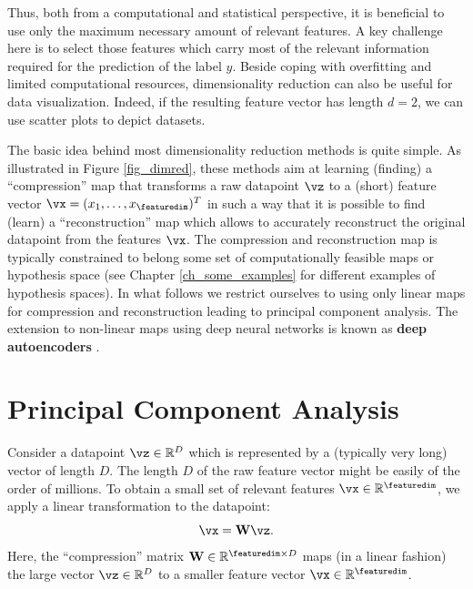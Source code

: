 \documentclass[12pt]{report}
\begin{document}
Thus, both from a computational and statistical perspective, it is beneficial to use 
only the maximum necessary amount of relevant features. A key challenge here is 
to select those features which carry most of the relevant information required for 
the prediction of the label $y$. Beside coping with overfitting and limited computational 
resources, dimensionality reduction can also be useful for data visualization. Indeed, if 
the resulting feature vector has length $d=2$, we can use scatter plots to depict datasets. 

The basic idea behind most dimensionality reduction methods is quite simple. As 
illustrated in Figure \ref{fig_dimred}, these methods aim at learning (finding) a ``compression'' 
map that transforms a raw datapoint $\vz$ to a (short) feature vector $\vx=(x_{1},\ldots,x_{\featuredim})^{T}$ 
in such a way that it is possible to find (learn) a ``reconstruction'' map which allows to accurately 
reconstruct the original datapoint from the features $\vx$. The compression and reconstruction 
map is typically constrained to belong some set of computationally feasible maps or hypothesis 
space (see Chapter \ref{ch_some_examples} for different examples of hypothesis spaces). In what 
follows we restrict ourselves to using only linear maps for compression and reconstruction leading 
to principal component analysis. The extension to non-linear maps using deep neural networks 
is known as {\bf deep autoencoders} \cite[Ch. 14]{Goodfellow-et-al-2016}. 


\section{Principal Component Analysis} 
\label{sec_pca}

Consider a datapoint $\vz \in \mathbb{R}^{D}$ which is represented by a (typically very long) 
vector of length $D$. The length $D$ of the raw feature vector might be easily of the order of 
millions. To obtain a small set of relevant features $\vx \in \mathbb{R}^{\featuredim}$, we apply 
a linear transformation to the datapoint: 
\begin{equation} 
\label{equ_feat_learning_matrix}
\vx = \mathbf{W} \vz.
\end{equation}
Here, the ``compression'' matrix $\mathbf{W} \in \mathbb{R}^{\featuredim \times D}$ maps 
(in a linear fashion) the large vector $\vz \in \mathbb{R}^{D}$ to a smaller feature vector $\vx \in \mathbb{R}^{\featuredim}$. %
\end{document}
